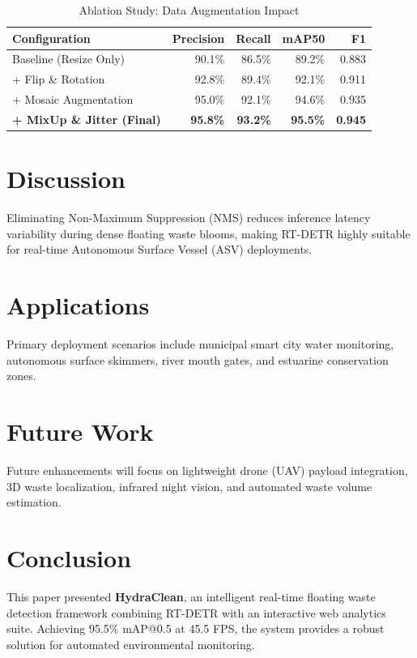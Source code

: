 \documentclass[10pt,journal,compsoc]{IEEEtran}
\begin{document}
\begin{table}[htbp]
\caption{Ablation Study: Data Augmentation Impact}
\centering
\begin{tabular}{lrrrr}
\toprule
\textbf{Configuration} & \textbf{Precision} & \textbf{Recall} & \textbf{mAP50} & \textbf{F1} \\
\midrule
Baseline (Resize Only) & 90.1\% & 86.5\% & 89.2\% & 0.883 \\
+ Flip \& Rotation & 92.8\% & 89.4\% & 92.1\% & 0.911 \\
+ Mosaic Augmentation & 95.0\% & 92.1\% & 94.6\% & 0.935 \\
\textbf{+ MixUp \& Jitter (Final)} & \textbf{95.8\%} & \textbf{93.2\%} & \textbf{95.5\%} & \textbf{0.945} \\
\bottomrule
\end{tabular}
\end{table}

\section{Discussion}
Eliminating Non-Maximum Suppression (NMS) reduces inference latency variability during dense floating waste blooms, making RT-DETR highly suitable for real-time Autonomous Surface Vessel (ASV) deployments.

\section{Applications}
Primary deployment scenarios include municipal smart city water monitoring, autonomous surface skimmers, river mouth gates, and estuarine conservation zones.

\section{Future Work}
Future enhancements will focus on lightweight drone (UAV) payload integration, 3D waste localization, infrared night vision, and automated waste volume estimation.

\section{Conclusion}
This paper presented \textbf{HydraClean}, an intelligent real-time floating waste detection framework combining RT-DETR with an interactive web analytics suite. Achieving 95.5\% mAP@0.5 at 45.5 FPS, the system provides a robust solution for automated environmental monitoring.
\end{document}
